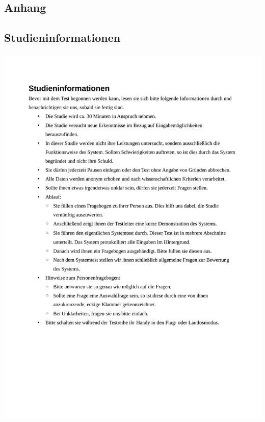 \documentclass[a4paper,12pt,bibliography=totoc]{scrreprt}%
\begin{document}
\begin{appendix} 
\chapter{Anhang}

\section{Studieninformationen}
\includegraphics[width=\textwidth]{apx/Studieninformationen} 
\label{lab:Studieninformationen}


\end{appendix}
\end{document}
